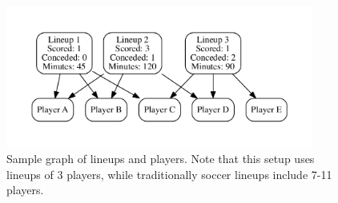 \documentclass[a4paper,10pt]{article}
\newcommand{\br}{\\[10pt]}
\begin{document}
  \br
  \begin{figure}[!htb]
    \centering
    \includegraphics[width=0.9\textwidth]{graph.pdf}
    \caption{Sample graph of lineups and players. Note that this setup uses lineups of 3 players, while traditionally soccer lineups include 7-11 players.}
  \end{figure}
  
\end{document}
